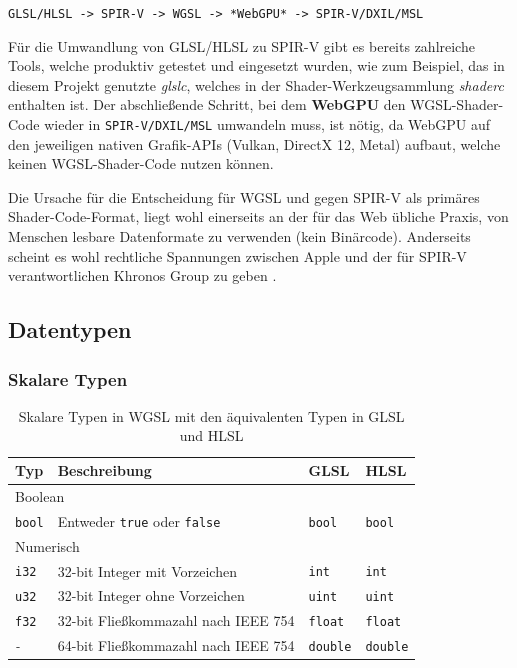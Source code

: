 \documentclass[oneside]{ausarbeitung}
\begin{document}
\texttt{GLSL/HLSL -> SPIR-V -> WGSL -> *WebGPU* -> SPIR-V/DXIL/MSL}

Für die Umwandlung von GLSL/HLSL zu SPIR-V gibt es bereits zahlreiche Tools, welche produktiv getestet und eingesetzt wurden, wie zum Beispiel, das in diesem Projekt genutzte \textit{glslc}, welches in der Shader-Werkzeugsammlung \textit{shaderc} \cite{shaderc} enthalten ist. Der abschließende Schritt, bei dem \textbf{WebGPU} den WGSL-Shader-Code wieder in \texttt{SPIR-V/DXIL/MSL} umwandeln muss, ist nötig, da WebGPU auf den jeweiligen nativen Grafik-APIs (Vulkan, DirectX 12, Metal) aufbaut, welche keinen WGSL-Shader-Code nutzen können.

Die Ursache für die Entscheidung für WGSL und gegen SPIR-V als primäres Shader-Code-Format, liegt wohl einerseits an der für das Web übliche Praxis, von Menschen lesbare Datenformate zu verwenden (kein Binärcode). Anderseits scheint es wohl rechtliche Spannungen zwischen Apple und der für SPIR-V verantwortlichen Khronos Group zu geben \cite[Vgl.][]{hacker_news:apple_khronos}.

\subsection{Datentypen}

\subsubsection{Skalare Typen}
\label{sub:scalars}
\begin{table}[htb]
\begin{center}
\begin{tabular}{ |l|l|l|l| }
    \hline
    \textbf{Typ} & \textbf{Beschreibung} & \textbf{GLSL} & \textbf{HLSL} \\
    \hline
    \multicolumn{4}{|l|}{Boolean} \\
    \hline
    \texttt{bool} & Entweder \texttt{true} oder \texttt{false} & \texttt{bool} & \texttt{bool} \\
    \hline
    \multicolumn{4}{|l|}{Numerisch} \\
    \hline
    \texttt{i32} & 32-bit Integer mit Vorzeichen & \texttt{int} & \texttt{int} \\
    \hline
    \texttt{u32} & 32-bit Integer ohne Vorzeichen & \texttt{uint} & \texttt{uint} \\
    \hline
    \texttt{f32} & 32-bit Fließkommazahl nach IEEE 754 & \texttt{float} & \texttt{float} \\
    \hline
    \textit{-} & 64-bit Fließkommazahl nach IEEE 754 & \texttt{double} & \texttt{double} \\
    \hline
\end{tabular}
\end{center}
\caption{Skalare Typen in WGSL mit den äquivalenten Typen in GLSL und HLSL}
\label{tab:scalars}
\end{table}
\end{document}
